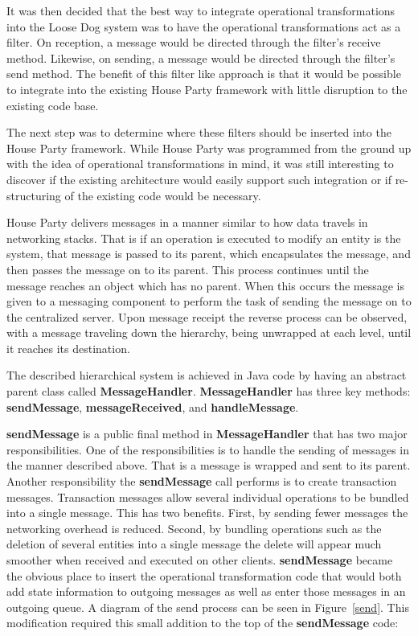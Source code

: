 \documentclass{article}
\begin{document}
It was then decided that the best way to integrate operational
transformations into the Loose Dog system was to have the operational
transformations act as a filter.  On reception, a message would be
directed through the filter's receive method.  Likewise, on sending, a
message would be directed through the filter's send method.  The
benefit of this filter like approach is that it would be possible to
integrate into the existing House Party framework with little
disruption to the existing code base.

The next step was to determine where these filters should be inserted
into the House Party framework.  While House Party was programmed from
the ground up with the idea of operational transformations in mind, it
was still interesting to discover if the existing architecture would
easily support such integration or if re-structuring of the existing
code would be necessary.

House Party delivers messages in a manner similar to how data travels
in networking stacks.  That is if an operation is executed to modify
an entity is the system, that message is passed to its parent, which
encapsulates the message, and then passes the message on to its
parent.  This process continues until the message reaches an object
which has no parent.  When this occurs the message is given to a
messaging component to perform the task of sending the message on to
the centralized server.  Upon message receipt the reverse process can
be observed, with a message traveling down the hierarchy, being
unwrapped at each level, until it reaches its destination.

The described hierarchical system is achieved in Java code by having an
abstract parent class called \textbf{MessageHandler}.
\textbf{MessageHandler} has three
key methods: \textbf{sendMessage}, \textbf{messageReceived}, and
\textbf{handleMessage}.

\textbf{sendMessage} is a public final method in
\textbf{MessageHandler} that has two
major responsibilities.  One of the responsibilities is to handle the
sending of messages in the manner described above.  That is a message
is wrapped and sent to its parent.  Another responsibility the
\textbf{sendMessage} call performs is to create transaction messages.
Transaction messages allow several individual operations to be bundled
into a single message.  This has two benefits.  First, by sending
fewer messages the networking overhead is reduced.  Second, by
bundling operations such as the deletion of several entities into a
single message the delete will appear much smoother when received and
executed on other clients.  \textbf{sendMessage} became the obvious place to
insert the operational transformation code that would both add state
information to outgoing messages as well as enter those messages in an
outgoing queue.  A diagram of the send process can be seen in
Figure~\ref{send}.  This modification required this small addition to the
top of the \textbf{sendMessage} code:
\end{document}
